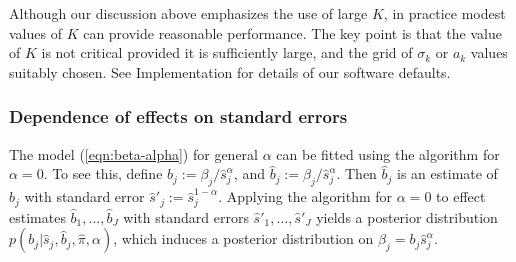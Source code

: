 \documentclass[11pt]{article}
\def\bhat{\hat{\beta}}
\def\shat{\hat{s}}
\def\qvalue{{\tt qvalue}\xspace}
\def\locfdr{{\tt locfdr}\xspace}
\def\mixfdr{{\tt mixfdr}\xspace}
\begin{document}
Although our discussion above emphasizes the use of large $K$, in practice modest values of $K$ can provide reasonable performance. 
The key point is that the value of $K$ is not critical provided it is sufficiently large, and the grid of $\sigma_k$ or $a_k$ values suitably chosen.
See Implementation for details of our software defaults.


\subsubsection*{Dependence of effects on standard errors}
 
The model (\ref{eqn:beta-alpha}) for general $\alpha$ can be fitted using the algorithm for $\alpha=0$. 
To see this, define $b_j:= \beta_j/ \shat_j^\alpha$, and $\hat{b}_j := \bhat_j/\shat_j^\alpha$. Then $\hat{b}_j$ is an estimate of $b_j$ with
 standard error $\shat'_j:=\shat_j^{1-\alpha}$. 
 Applying the algorithm for $\alpha=0$ to effect estimates $\hat{b}_1,\dots,\hat{b}_J$ with standard errors $\shat'_1,\dots,\shat'_J$
yields a posterior distribution $p(b_j | \shat_j, \hat{b}_j, \hat{\pi}, \alpha)$, which induces a posterior distribution on $\beta_j = b_j \shat_j^\alpha$.

\end{document}
